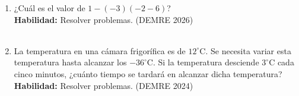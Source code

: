 \documentclass[11pt,letterpaper]{article}
\newenvironment{alternativas}{%
\begin{enumerate}[label=\Alph*), leftmargin=14pt, itemsep=2pt, topsep=2pt]
}{\end{enumerate}}
\begin{document}
\begin{enumerate}[label=\textbf{\arabic*.}, leftmargin=*, itemsep=8pt]
\item
\begin{minipage}[t]{\linewidth}
¿Cuál es el valor de $1-(-3)(-2-6)$?\\
\textbf{Habilidad:} Resolver problemas. (DEMRE 2026)\\
\\%
\begin{minipage}{\linewidth}
\vspace{7mm}
\end{minipage}
\vspace{7mm}
\end{minipage}

\item
\begin{minipage}[t]{\linewidth}
La temperatura en una cámara frigorífica es de $12^\circ\mathrm{C}$. Se necesita variar esta temperatura hasta alcanzar los $-36^\circ\mathrm{C}$. Si la temperatura desciende $3^\circ\mathrm{C}$ cada cinco minutos, ¿cuánto tiempo se tardará en alcanzar dicha temperatura?\\
\textbf{Habilidad:} Resolver problemas. (DEMRE 2024)\\
\\%
\begin{minipage}{\linewidth}
\vspace{7mm}
\end{minipage}
\vspace{7mm}
\end{minipage}


\end{enumerate}
\end{document}
